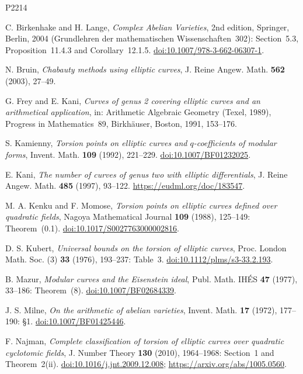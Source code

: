 \documentclass[11pt]{article}
\begin{document}
\begin{thebibliography}{P2214}

C. Birkenhake and H. Lange, \emph{Complex Abelian Varieties}, 2nd edition, Springer, Berlin,
2004 (Grundlehren der mathematischen Wissenschaften~302): Section~5.3, Proposition~11.4.3 and
Corollary~12.1.5.
\href{https://doi.org/10.1007/978-3-662-06307-1}{doi:10.1007/978-3-662-06307-1}.

N. Bruin, \emph{Chabauty methods using elliptic curves}, J. Reine Angew. Math. \textbf{562} (2003),
27--49.

G. Frey and E. Kani, \emph{Curves of genus 2 covering elliptic curves and an arithmetical
application}, in: Arithmetic Algebraic Geometry (Texel, 1989), Progress in Mathematics~89,
Birkh\"auser, Boston, 1991, 153--176.

S. Kamienny, \emph{Torsion points on elliptic curves and \(q\)-coefficients of modular forms}, Invent.
Math. \textbf{109} (1992), 221--229.
\href{https://doi.org/10.1007/BF01232025}{doi:10.1007/BF01232025}.

E. Kani, \emph{The number of curves of genus two with elliptic differentials}, J. Reine Angew. Math.
\textbf{485} (1997), 93--122. \url{https://eudml.org/doc/183547}.

M. A. Kenku and F. Momose, \emph{Torsion points on elliptic curves defined over quadratic
fields}, Nagoya Mathematical Journal \textbf{109} (1988), 125--149: Theorem~(0.1).
\href{https://doi.org/10.1017/S0027763000002816}{doi:10.1017/S0027763000002816}.

D. S. Kubert, \emph{Universal bounds on the torsion of elliptic curves}, Proc. London Math. Soc.
(3) \textbf{33} (1976), 193--237: Table~3.
\href{https://doi.org/10.1112/plms/s3-33.2.193}{doi:10.1112/plms/s3-33.2.193}.

B. Mazur, \emph{Modular curves and the Eisenstein ideal}, Publ. Math. IH\'ES \textbf{47} (1977),
33--186: Theorem~(8). \href{https://doi.org/10.1007/BF02684339}{doi:10.1007/BF02684339}.

J. S. Milne, \emph{On the arithmetic of abelian varieties}, Invent. Math. \textbf{17} (1972),
177--190: \S1. \href{https://doi.org/10.1007/BF01425446}{doi:10.1007/BF01425446}.

F. Najman, \emph{Complete classification of torsion of elliptic curves over quadratic cyclotomic
fields}, J. Number Theory \textbf{130} (2010), 1964--1968: Section~1 and Theorem~2(ii).
\href{https://doi.org/10.1016/j.jnt.2009.12.008}{doi:10.1016/j.jnt.2009.12.008};
\url{https://arxiv.org/abs/1005.0560}.


\end{thebibliography}
\end{document}
